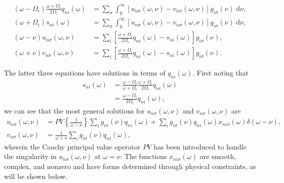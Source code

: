 \begin{equation}\label{eq:hybridizationCoefficientsSystemManyModes}
\begin{split}
(\omega - \Omega_i)\frac{\omega + \Omega_i}{2\Omega_i}q_{ni}(\omega) &= \sum_\sigma\int_0^\infty\left[u_{n\sigma}(\omega,\nu) - v_{n\sigma}(\omega,\nu)\right]g_{i\sigma}(\nu)\;\mathrm{d}\nu,\\
(\omega + \Omega_i)s_{ni}(\omega) &= \sum_\sigma\int_0^\infty\left[u_{n\sigma}(\omega,\nu) - v_{n\sigma}(\omega,\nu)\right]g_{i\sigma}(\nu)\;\mathrm{d}\nu,\\
(\omega - \nu )u_{n\sigma}(\omega,\nu) &= \sum_i\left[\frac{\omega + \Omega_i}{2\Omega_i}q_{ni}(\omega) - s_{ni}(\omega)\right]g_{i\sigma}(\nu),\\
(\omega + \nu )v_{n\sigma}(\omega,\nu) &= \sum_i\left[\frac{\omega + \Omega_i}{2\Omega_i}q_{ni}(\omega) - s_{ni}(\omega)\right]g_{i\sigma}(\nu).
\end{split}
\end{equation}

The latter three equations have solutions in terms of $q_{ni}(\omega)$. First noting that
\begin{equation}
\begin{split}
s_{ni}(\omega) &= \frac{\omega - \Omega_i}{\omega + \Omega_i}\frac{\omega + \Omega_i}{2\Omega_i}q_{ni}(\omega)\\
&= \frac{\omega - \Omega_i}{2\Omega_i}q_{ni}(\omega),
\end{split}
\end{equation}
we can see that the most general solutions for $u_{n\sigma}(\omega,\nu)$ and $v_{n\sigma}(\omega,\nu)$ are
\begin{equation}\label{eq:uvDefinition}
\begin{split}
u_{n\sigma}(\omega,\nu) &= PV\left\{\frac{1}{\omega - \nu }\right\}\sum_ig_{i\sigma}(\nu)q_{ni}(\omega) + \sum_ig_{i\sigma}(\nu)q_{ni}(\omega)x_{ni\sigma}(\omega)\delta(\omega - \nu ),\\
v_{n\sigma}(\omega,\nu) &= \frac{1}{\omega + \nu }\sum_ig_{i\sigma}(\nu)q_{ni}(\omega),
\end{split}
\end{equation}
wherein the Cauchy principal value operator $PV$ has been introduced to handle the singularity in $u_{n\sigma}(\omega,\nu)$ at $\omega = \nu$. The functions $x_{ni\sigma}(\omega)$ are smooth, complex, and nonzero and have forms determined through physical constraints, as will be shown below. 

